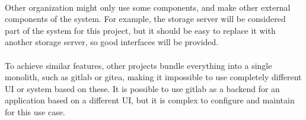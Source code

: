 \paragraph{}
Other organization might only use some components, and make other external components of the system. For example, the storage server will be considered part of the system for this project, but it should be easy to replace it with another storage server, so good interfaces will be provided.

\paragraph{}
To achieve similar features, other projects bundle everything into a single monolith, such as gitlab or gitea, making it impossible to use completely different UI or system based on these. It is possible to use gitlab as a backend for an application based on a different UI, but it is complex to configure and maintain for this use case.  
